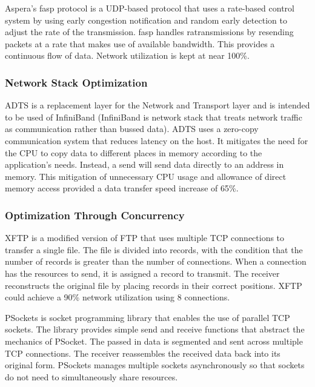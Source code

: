 Aspera's fasp protocol \cite{Aspera2016}\cite{Fan2010} is a UDP-based protocol that uses a rate-based control system by using early congestion notification and random early detection to adjust the rate of the transmission. fasp handles ratransmissions by resending packets at a rate that makes use of available bandwidth. This provides a continuous flow of data. Network utilization is kept at near 100\%.

\subsubsection{Network Stack Optimization}

ADTS \cite{lai2009designing} is a replacement layer for the Network and Transport layer and is intended to be used of InfiniBand \cite{Pfister2001} (InfiniBand is network stack that treats network traffic as communication rather than bussed data). ADTS uses a zero-copy communication system that reduces latency on the host. It mitigates the need for the CPU to copy data to different places in memory according to the application's needs. Instead, a send will send data directly to an address in memory. This mitigation of unnecessary CPU usage and allowance of direct memory access provided a data transfer speed increase of 65\%.

\subsubsection{Optimization Through Concurrency}

XFTP \cite{Allman1995}\cite{Allman1997} is a modified version of FTP \cite{postel1980user} that uses multiple TCP connections to transfer a single file. The file is divided into records, with the condition that the number of records is greater than the number of connections. When a connection has the resources to send, it is assigned a record to transmit. The receiver reconstructs the original file by placing records in their correct positions. XFTP could achieve a 90\% network utilization using 8 connections.

PSockets \cite{Sivakumar2000psockets} is socket programming library that enables the use of parallel TCP sockets. The library provides simple send and receive functions that abstract the mechanics of PSocket. The passed in data is segmented and sent across multiple TCP connections. The receiver reassembles the received data back into its original form. PSockets manages multiple sockets asynchronously so that sockets do not need to simultaneously share resources. 


